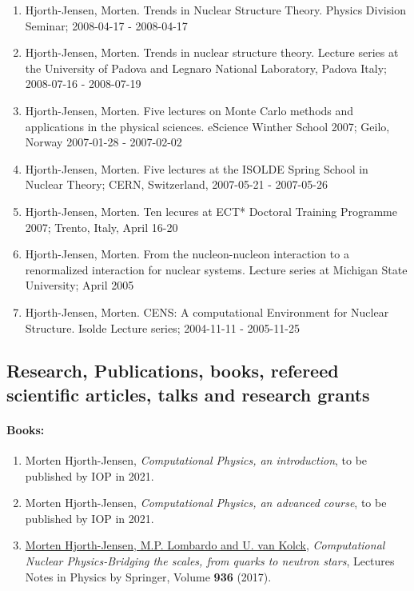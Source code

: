 \documentclass[%
oneside,                 %
final,                   %
10pt]{article}
\begin{document}
\begin{enumerate}
\item Hjorth-Jensen, Morten.  Trends in Nuclear Structure Theory. Physics Division Seminar; 2008-04-17 - 2008-04-17

\item Hjorth-Jensen, Morten.  Trends in nuclear structure theory. Lecture series at the University of Padova and Legnaro National Laboratory, Padova Italy; 2008-07-16 - 2008-07-19

\item Hjorth-Jensen, Morten.  Five lectures on  Monte Carlo methods and applications in the physical sciences. eScience Winther School 2007; Geilo, Norway 2007-01-28 - 2007-02-02

\item Hjorth-Jensen, Morten.  Five lectures at the ISOLDE Spring School in Nuclear Theory; CERN, Switzerland, 2007-05-21 - 2007-05-26

\item Hjorth-Jensen, Morten.  Ten lecures at  ECT* Doctoral Training Programme 2007; Trento, Italy, April 16-20

\item Hjorth-Jensen, Morten.  From the nucleon-nucleon interaction to a renormalized interaction for nuclear systems. Lecture series at Michigan State University; April 2005

\item Hjorth-Jensen, Morten. CENS: A computational Environment for Nuclear Structure. Isolde Lecture series; 2004-11-11 - 2005-11-25
\end{enumerate}

\noindent
\subsection{Research, Publications, books, refereed scientific articles, talks and research grants}

\paragraph{Books:}
\begin{enumerate}
\item Morten Hjorth-Jensen, \emph{Computational Physics, an introduction}, to be published by IOP in 2021.

\item Morten Hjorth-Jensen, \emph{Computational Physics, an advanced course}, to be published by IOP in 2021.

\item \href{{http://www.springer.com/us/book/9783319533353}}{Morten Hjorth-Jensen, M.P. Lombardo and U. van Kolck}, \emph{Computational Nuclear Physics-Bridging the scales, from quarks to neutron stars}, Lectures Notes in Physics by Springer, Volume \textbf{936} (2017).
\end{enumerate}
\end{document}
